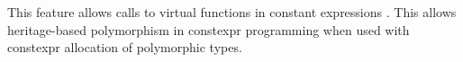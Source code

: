 \documentclass[../main]{subfiles}
\begin{document}
This feature allows calls to virtual functions in constant expressions
\cite{virtual-constexpr}. This allows heritage-based polymorphism in \gls{constexpr}
programming when used with \gls{constexpr} allocation of polymorphic types.



%




\end{document}
